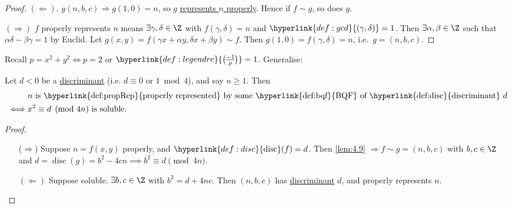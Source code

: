 \documentclass{article}
\newcommand{\legendre}[2]{\genfrac{(}{)}{}{}{#1}{#2}}
\DeclareMathOperator{\disc}{disc}
\begin{document}
\begin{proof}
    $(\Leftarrow)$. $g(n, b, c) \Rightarrow g(1, 0) = n$, so $g$ \hyperlink{def:propRep}{represents $n$ properly}. Hence if $f \sim g$, so does $g$.

    $(\Rightarrow)$ $f$ properly represents $n$ means $\exists \gamma, \delta \in \Z$ with $f(\gamma, \delta) = n$ and $\hyperlink{def:gcd}{(\gamma, \delta)} = 1$.
    Then $\exists \alpha, \beta \in \Z$ such that $\alpha \delta - \beta \gamma = 1$ by Euclid.
    Let $g(x,y) = f(\gamma x + \alpha y, \delta x +\beta y) \sim f$.
    Then $g(1, 0) = f(\gamma, \delta) = n$, i.e.\ $g = (n, b, c)$.
\end{proof}

Recall $p = x^2 + y^2 \iff p = 2$ or $\hyperlink{def:legendre}{\legendre{-1}{p}} = 1$. Generalise:

\begin{nthm}\label{thm:4.10}
    Let $d < 0$ be a \hyperlink{def:disc}{discriminant} (i.e. $d \equiv 0 \text{ or } 1 \bmod{4}$), and say $n \geq 1$.
    Then
    \begin{align*}
        & n\text{ is \hyperlink{def:propRep}{properly represented} by some \hyperlink{def:bqf}{BQF} of \hyperlink{def:disc}{discriminant} } d \\
        \iff &x^2 \equiv d \pmod{4n} \text{ is soluble}.
    \end{align*}
\end{nthm}

\begin{proof}
    \begin{itemize}
        \item [($\Rightarrow$)] Suppose $n = f(x, y)$ properly, and $\hyperlink{def:disc}{\disc}(f) = d$.
            Then \cref{lem:4.9} $\Rightarrow f \sim g = (n, b, c)$ with $b, c \in \Z$ and $d = \disc(g) = b^2 - 4cn \implies b^2 \equiv d \pmod{4n}$.
        \item [$(\Leftarrow)$] Suppose soluble. $\exists b, c \in \Z$ with $b^2 = d + 4 n c$.
            Then $(n, b, c)$ has \hyperlink{def:disc}{discriminant} $d$, and properly represents $n$. \qedhere
    \end{itemize}
\end{proof}
\end{document}

